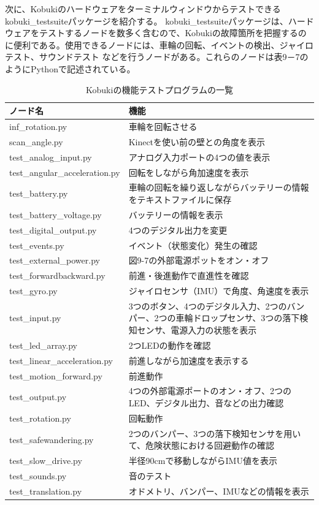 \begin{itemize}
次に、Kobukiのハードウェアをターミナルウィンドウからテストできるkobuki\_testsuiteパッケージを紹介する。
kobuki\_testsuiteパッケージは、ハードウェアをテストするノードを数多く含むので、Kobukiの故障箇所を把握するのに便利である。使用できるノードには、車輪の回転、イベントの検出、ジャイロテスト、サウンドテスト  などを行うノードがある。これらのノードは表9－7のようにPythonで記述されている。

\begin{table}[h]
\centering
\begin{tabular}{l l}
\toprule
\textbf{ノード名} & \textbf{機能}\\
\midrule
inf\_rotation.py & 車輪を回転させる \\
scan\_angle.py & Kinectを使い前の壁との角度を表示 \\
test\_analog\_input.py  & アナログ入力ポートの4つの値を表示 \\
test\_angular\_acceleration.py  & 回転をしながら角加速度を表示 \\
test\_battery.py & 車輪の回転を繰り返しながらバッテリーの情報をテキストファイルに保存 \\
test\_battery\_voltage.py & バッテリーの情報を表示 \\
test\_digital\_output.py  & 4つのデジタル出力を変更 \\
test\_events.py  & イベント（状態変化）発生の確認 \\
test\_external\_power.py  & 図9-7の外部電源ポットをオン・オフ \\
test\_forwardbackward.py & 前進・後進動作で直進性を確認 \\
test\_gyro.py  & ジャイロセンサ（IMU）で角度、角速度を表示 \\
test\_input.py & 3つのボタン、4つのデジタル入力、2つのバンパー、2つの車輪ドロップセンサ、3つの落下検知センサ、電源入力の状態を表示 \\
test\_led\_array.py & 2つLEDの動作を確認 \\
test\_linear\_acceleration.py & 前進しながら加速度を表示する \\
test\_motion\_forward.py &  前進動作 \\
test\_output.py &  4つの外部電源ポートのオン・オフ、2つのLED、デジタル出力、音などの出力確認 \\
test\_rotation.py  & 回転動作 \\
test\_safewandering.py & 2つのバンパー、3つの落下検知センサを用いて、危険状態における回避動作の確認 \\
test\_slow\_drive.py  & 半径90cmで移動しながらIMU値を表示 \\
test\_sounds.py  & 音のテスト \\
test\_translation.py & オドメトリ、バンパー、IMUなどの情報を表示 \\
\bottomrule
\end{tabular}
\caption{Kobukiの機能テストプログラムの一覧}
\end{table}


\end{itemize}
